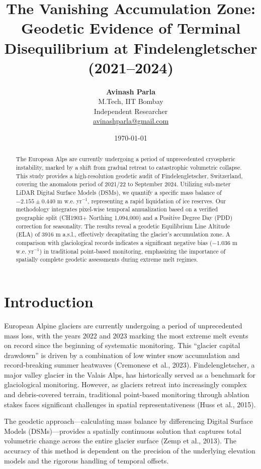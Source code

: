 \documentclass[12pt, a4paper]{article}
\title{\textbf{The Vanishing Accumulation Zone: Geodetic Evidence of Terminal Disequilibrium at Findelengletscher (2021--2024)}}
\author{
	\textbf{Avinash Parla} \\
	\small M.Tech, IIT Bombay \\
	\small Independent Researcher \\
	\small \url{avinashparla@gmail.com}
}
\date{\today}
\begin{document}
	
	\maketitle
	
	\begin{abstract}
		The European Alps are currently undergoing a period of unprecedented cryospheric instability, marked by a shift from gradual retreat to catastrophic volumetric collapse. This study provides a high-resolution geodetic audit of Findelengletscher, Switzerland, covering the anomalous period of 2021/22 to September 2024. Utilizing sub-meter LiDAR Digital Surface Models (DSMs), we quantify a specific mass balance of $-2.155 \pm 0.440$ m w.e. yr$^{-1}$, representing a rapid liquidation of ice reserves. Our methodology integrates pixel-wise temporal annualization based on a verified geographic split (CH1903+ Northing 1,094,000) and a Positive Degree Day (PDD) correction for seasonality. The results reveal a geodetic Equilibrium Line Altitude (ELA) of 3916 m a.s.l., effectively decapitating the glacier's accumulation zone. A comparison with glaciological records indicates a significant negative bias ($-1.036$ m w.e. yr$^{-1}$) in traditional point-based monitoring, emphasizing the importance of spatially complete geodetic assessments during extreme melt regimes.
	\end{abstract}
	
	\section{Introduction}
	European Alpine glaciers are currently undergoing a period of unprecedented mass loss, with the years 2022 and 2023 marking the most extreme melt events on record since the beginning of systematic monitoring. This ``glacier capital drawdown'' is driven by a combination of low winter snow accumulation and record-breaking summer heatwaves (Cremonese et al., 2023). Findelengletscher, a major valley glacier in the Valais Alps, has historically served as a benchmark for glaciological monitoring. However, as glaciers retreat into increasingly complex and debris-covered terrain, traditional point-based monitoring through ablation stakes faces significant challenges in spatial representativeness (Huss et al., 2015).
	
	The geodetic approach---calculating mass balance by differencing Digital Surface Models (DSMs)---provides a spatially continuous solution that captures total volumetric change across the entire glacier surface (Zemp et al., 2013). The accuracy of this method is dependent on the precision of the underlying elevation models and the rigorous handling of temporal offsets. 
	
\end{document}
